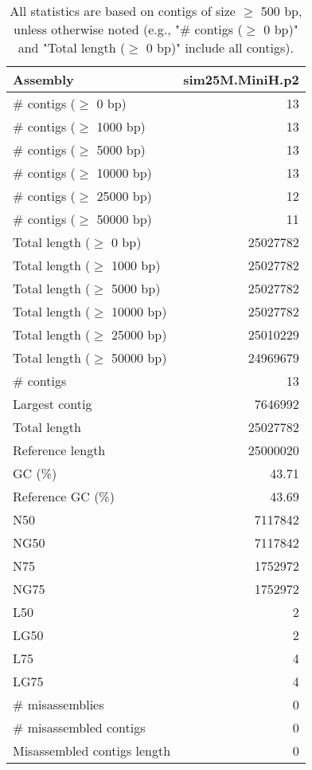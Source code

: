\documentclass[12pt,a4paper]{article}
\begin{document}
\begin{table}[ht]
\begin{center}
\caption{All statistics are based on contigs of size $\geq$ 500 bp, unless otherwise noted (e.g., "\# contigs ($\geq$ 0 bp)" and "Total length ($\geq$ 0 bp)" include all contigs).}
\begin{tabular}{|l*{1}{|r}|}
\hline
Assembly & sim25M.MiniH.p2 \\ \hline
\# contigs ($\geq$ 0 bp) & 13 \\ \hline
\# contigs ($\geq$ 1000 bp) & 13 \\ \hline
\# contigs ($\geq$ 5000 bp) & 13 \\ \hline
\# contigs ($\geq$ 10000 bp) & 13 \\ \hline
\# contigs ($\geq$ 25000 bp) & 12 \\ \hline
\# contigs ($\geq$ 50000 bp) & 11 \\ \hline
Total length ($\geq$ 0 bp) & 25027782 \\ \hline
Total length ($\geq$ 1000 bp) & 25027782 \\ \hline
Total length ($\geq$ 5000 bp) & 25027782 \\ \hline
Total length ($\geq$ 10000 bp) & 25027782 \\ \hline
Total length ($\geq$ 25000 bp) & 25010229 \\ \hline
Total length ($\geq$ 50000 bp) & 24969679 \\ \hline
\# contigs & 13 \\ \hline
Largest contig & 7646992 \\ \hline
Total length & 25027782 \\ \hline
Reference length & 25000020 \\ \hline
GC (\%) & 43.71 \\ \hline
Reference GC (\%) & 43.69 \\ \hline
N50 & 7117842 \\ \hline
NG50 & 7117842 \\ \hline
N75 & 1752972 \\ \hline
NG75 & 1752972 \\ \hline
L50 & 2 \\ \hline
LG50 & 2 \\ \hline
L75 & 4 \\ \hline
LG75 & 4 \\ \hline
\# misassemblies & 0 \\ \hline
\# misassembled contigs & 0 \\ \hline
Misassembled contigs length & 0 \\ \hline

\end{tabular}
\end{center}
\end{table}
\end{document}
